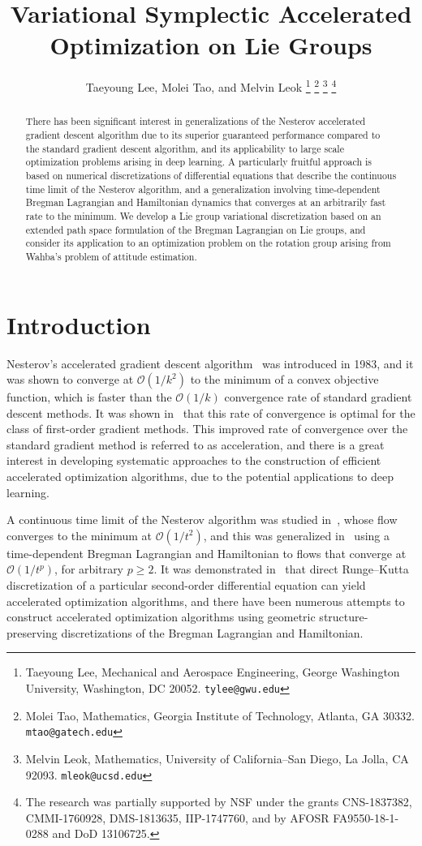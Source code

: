 \documentclass[letterpaper, 10pt, conference]{ieeeconf}
\title{\LARGE \bf Variational Symplectic Accelerated Optimization on Lie Groups}
\author{%
    Taeyoung Lee, Molei Tao, and Melvin Leok%
    \thanks{Taeyoung Lee, Mechanical and Aerospace Engineering, George Washington University, Washington, DC 20052. {\tt tylee@gwu.edu}}%
    \thanks{Molei Tao, Mathematics, Georgia Institute of Technology, Atlanta, GA 30332. {\tt mtao@gatech.edu}}
    \thanks{Melvin Leok, Mathematics, University of California--San Diego, La Jolla, CA 92093. {\tt mleok@ucsd.edu}}
    \thanks{The research was partially supported by NSF under the grants CNS-1837382, CMMI-1760928, DMS-1813635, IIP-1747760, and by AFOSR FA9550-18-1-0288 and DoD 13106725.}
}
\begin{document}
\allowdisplaybreaks

\maketitle \thispagestyle{empty} \pagestyle{empty}

\begin{abstract}
There has been significant interest in generalizations of the Nesterov accelerated gradient descent algorithm due to its superior guaranteed performance compared to the standard gradient descent algorithm, and its applicability to large scale optimization problems arising in deep learning.
A particularly fruitful approach is based on numerical discretizations of differential equations that describe the continuous time limit of the Nesterov algorithm, and a generalization involving time-dependent Bregman Lagrangian and Hamiltonian dynamics that converges at an arbitrarily fast rate to the minimum.
We develop a Lie group variational discretization based on an extended path space formulation of the Bregman Lagrangian on Lie groups, and consider its application to an optimization problem on the rotation group arising from Wahba's problem of attitude estimation.
\end{abstract}

\section{Introduction}

Nesterov's accelerated gradient descent algorithm~\cite{Nes83} was introduced in 1983, and it was shown to converge at $\mathcal{O}(1/k^2)$ to the minimum of a convex objective function, which is faster than the $\mathcal{O}(1/k)$ convergence rate of standard gradient descent methods.
It was shown in~\cite{nesterov2003introductory} that this rate of convergence is optimal for the class of first-order gradient methods.
This improved rate of convergence over the standard gradient method is referred to as acceleration, and there is a great interest in developing systematic approaches to the construction of efficient accelerated optimization algorithms, due to the potential applications to deep learning.

A continuous time limit of the Nesterov algorithm was studied in~\cite{su2016differential}, whose flow converges to the minimum at $\mathcal{O}(1/t^2)$, and this was generalized in~\cite{wibisono2016variational} using a time-dependent Bregman Lagrangian and Hamiltonian to flows that converge at $\mathcal{O}(1/t^p)$, for arbitrary $p\geq 2$.
It was demonstrated in~\cite{ZhMoSrJa2018} that direct Runge--Kutta discretization of a particular second-order differential equation can yield accelerated optimization algorithms, and there have been numerous attempts to construct accelerated optimization algorithms using geometric structure-preserving discretizations of the Bregman Lagrangian and Hamiltonian.
\end{document}
